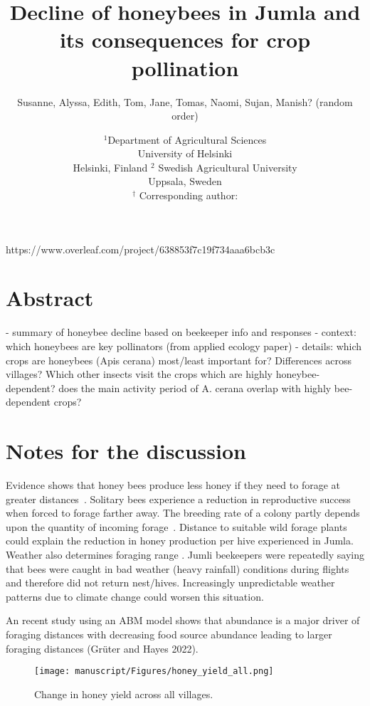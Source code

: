 \documentclass[12pt]{article}
\title{Decline of honeybees in Jumla and its consequences for crop pollination}
\author{Susanne, Alyssa, Edith, Tom, Jane, Tomas, Naomi, Sujan, Manish? (random order)}
\date{\small$^1$Department of Agricultural Sciences\\ 
University of Helsinki\\
Helsinki, Finland
\medskip
\small$^2$ Swedish Agricultural University\\
Uppsala, Sweden\\
\medskip
$^\dagger$ Corresponding author:\\
 }
\begin{document}
 
\maketitle 
\raggedright
\setlength{\parindent}{15pt} 

\clearpage
\linenumbers
\begin{spacing}{2.0}https://www.overleaf.com/project/638853f7c19f734aaa6bcb3c

\section*{Abstract} 
- summary of honeybee decline based on beekeeper info and responses
- context: which honeybees are key pollinators (from applied ecology paper)
- details: which crops are honeybees (Apis cerana) most/least important for? Differences across villages? Which other insects visit the crops which are highly honeybee-dependent? does the main activity period of A. cerana overlap with highly bee-dependent crops?

\section*{Notes for the discussion}
Evidence shows that honey bees produce less honey if they need to forage at greater distances~\citep{Ribbands1951}. Solitary bees experience a reduction in reproductive success when forced to forage farther away. The breeding rate
 of a colony partly depends upon the quantity of incoming forage~\citep{Nolan1925}. Distance to suitable wild forage plants could explain the reduction in honey production per hive experienced in Jumla. 
 Weather also determines foraging range \citep{Ribbands1951}. Jumli beekeepers were repeatedly saying that bees were caught in bad weather (heavy rainfall) conditions during flights and therefore did not return nest/hives. Increasingly unpredictable weather patterns due to climate change could worsen this situation. 

An recent study using an ABM model shows that abundance is a major driver of foraging distances with decreasing food source abundance leading to larger foraging distances (Grüter and Hayes 2022).



        \begin{figure}[hb!]
        \centering
        \texttt{[image: manuscript/Figures/honey\_yield\_all.png]}
        \caption{Change in honey yield across all villages.}
        \label{fig:honey_yield_all}
        \end{figure} 



\end{spacing}
\end{document}
